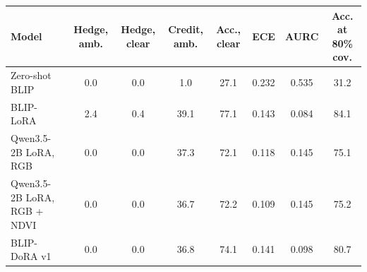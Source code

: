 \begin{tabular}{lccccccc}
\toprule
Model & Hedge, amb. & Hedge, clear & Credit, amb. & Acc., clear & ECE & AURC & Acc. at 80\% cov. \\
\midrule
Zero-shot BLIP & 0.0 & 0.0 & 1.0 & 27.1 & 0.232 & 0.535 & 31.2 \\
BLIP-LoRA & 2.4 & 0.4 & 39.1 & 77.1 & 0.143 & 0.084 & 84.1 \\
Qwen3.5-2B LoRA, RGB & 0.0 & 0.0 & 37.3 & 72.1 & 0.118 & 0.145 & 75.1 \\
Qwen3.5-2B LoRA, RGB + NDVI & 0.0 & 0.0 & 36.7 & 72.2 & 0.109 & 0.145 & 75.2 \\
BLIP-DoRA v1 & 0.0 & 0.0 & 36.8 & 74.1 & 0.141 & 0.098 & 80.7 \\
\bottomrule
\end{tabular}
